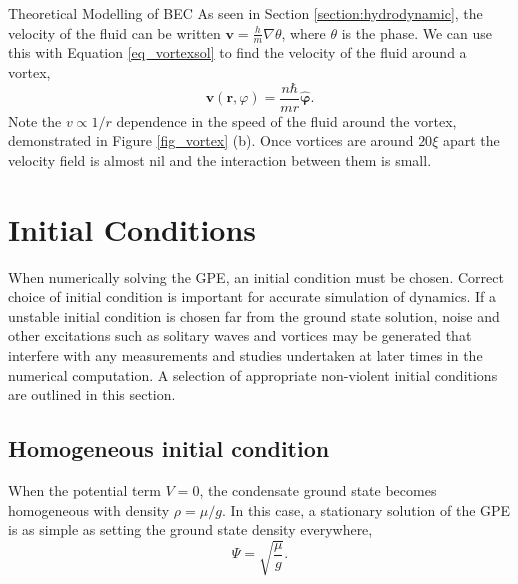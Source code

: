 \begin{chapter}{\label{cha:theoretical_model}Theoretical Modelling of BEC}
As seen in Section \ref{section:hydrodynamic}, the velocity of the fluid can be written $\mathbf{v} = \frac{h}{m}\nabla\theta$, where $\theta$ is the phase. We can use this with Equation \ref{eq_vortexsol} to find the velocity of the fluid around a vortex,
	\begin{equation}\label{eq_vortexvel}
	\mathbf{v}(\mathbf{r},\varphi) = \frac{n \hbar}{mr} {\bm{\hat{\varphi}}}.
	\end{equation}
Note the $v \propto 1/r$ dependence in the speed of the fluid around the vortex, demonstrated in Figure \ref{fig_vortex} (b). Once vortices are around $20\xi$ apart the velocity field is almost nil and the interaction between them is small.



\section{\label{section:inital} Initial Conditions}
	When numerically solving the GPE, an initial condition must be chosen. Correct choice of initial condition is important for accurate simulation of dynamics. If a unstable initial condition is chosen far from the ground state solution, noise and other excitations such as solitary waves and vortices may be generated that interfere with any measurements and studies undertaken at later times in the numerical computation. A selection of appropriate non-violent initial conditions are outlined in this section. 
	\subsection{\label{section:homoinit} Homogeneous initial condition}
	When the potential term $V=0$, the condensate ground state becomes homogeneous with density $\rho=\mu/g$. In this case, a stationary solution of the GPE is as simple as setting the ground state density everywhere,
	\begin{equation}
		\Psi = \sqrt{\frac{\mu}{g}}.
		\label{eq:homoinit}
	\end{equation}


\end{chapter}
